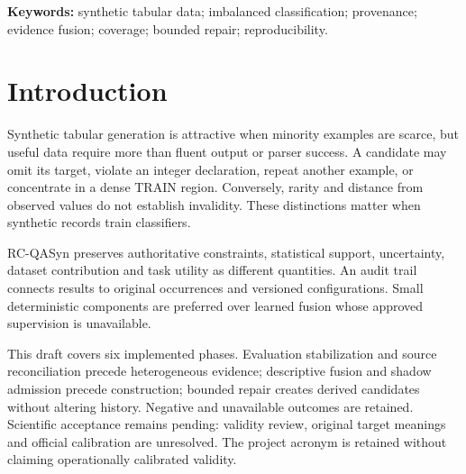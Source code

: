 \begin{abstract}
Synthetic tabular records can be parseable while failing a source schema, statistically unusual without being invalid, or individually plausible while providing redundant dataset coverage. RC-QASyn separates these questions in an auditable prototype. It binds generated occurrences to sources, distinguishes authoritative structure from local/global TRAIN support, reports descriptive dependent evidence, constructs fixed-budget provisional datasets and applies narrowly approved integer-only repair. A three-dataset historical study contains 601 occurrences and 75 structural rejects. Only 54 qualify for repair; all become structurally compatible, with 49 provisional passes and five review-required outcomes under the unchanged shadow policy. Twenty-one rejects remain ineligible. Construction and 138 predeclared task-utility comparisons are reproducible; 114 return results and 24 are explicitly unavailable. Coverage and classifier utility do not improve uniformly. The 120-record validity cohort has no human-final approvals, so validity calibration and human-ground-truth performance remain unavailable. The contribution is an inspectable workflow and bounded exploratory evidence, not proof of semantic validity, calibrated risk or generalization.
\end{abstract}
\noindent\textbf{Keywords:} synthetic tabular data; imbalanced classification; provenance; evidence fusion; coverage; bounded repair; reproducibility.

\section{Introduction}
Synthetic tabular generation is attractive when minority examples are scarce, but useful data require more than fluent output or parser success. A candidate may omit its target, violate an integer declaration, repeat another example, or concentrate in a dense TRAIN region. Conversely, rarity and distance from observed values do not establish invalidity. These distinctions matter when synthetic records train classifiers.

RC-QASyn preserves authoritative constraints, statistical support, uncertainty, dataset contribution and task utility as different quantities. An audit trail connects results to original occurrences and versioned configurations. Small deterministic components are preferred over learned fusion whose approved supervision is unavailable.

This draft covers six implemented phases. Evaluation stabilization and source reconciliation precede heterogeneous evidence; descriptive fusion and shadow admission precede construction; bounded repair creates derived candidates without altering history. Negative and unavailable outcomes are retained. Scientific acceptance remains pending: validity review, original target meanings and official calibration are unresolved. The project acronym is retained without claiming operationally calibrated validity.

